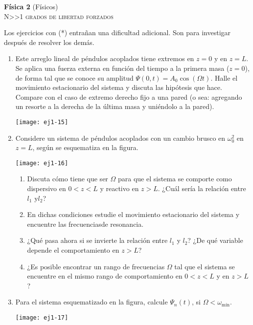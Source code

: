 \documentclass[11pt,spanish,a4paper]{article}
\begin{document}
\begin{center}
	\textbf{Física 2} (Físicos) \hfill {}\\
	\textsc{\LARGE N\textgreater\textgreater1 grados de libertad forzados}
\end{center}

Los ejercicios con (*) entrañan una dificultad adicional. Son para investigar después de resolver los demás.


\begin{enumerate}

				
\item
\begin{minipage}[t][3.5cm]{0.6\textwidth}
Este arreglo lineal de péndulos acoplados tiene extremos en $z= 0$ y en $z= L$.
Se aplica una fuerza externa en función del tiempo a la primera masa ($z=0$), de forma tal que se conoce su amplitud $\Psi(0,t)= A_0 \cos(\Omega t)$.
Halle el movimiento estacionario del sistema y discuta las hipótesis que hace.
Compare con el caso de extremo derecho fijo a una pared (o sea: agregando un resorte a la derecha de la última masa y uniéndolo a la pared). 
\end{minipage}
\begin{minipage}[c][0cm][t]{0.35\textwidth}
  \texttt{[image: ej1-15]}
\end{minipage}



\item
\begin{minipage}[t][3cm]{0.35\textwidth}
Considere un sistema de péndulos acoplados con un cambio brusco en $\omega_{0}^{2}$ en $z=L$, según se esquematiza en la figura.
\end{minipage}
\begin{minipage}[c][3cm][t]{0.6\textwidth}
  \texttt{[image: ej1-16]}
\end{minipage}
\begin{enumerate}
	\item Discuta cómo tiene que ser \(\Omega\) para que el sistema se comporte como dispersivo en \(0< z < L\) y reactivo en \(z > L\).
	¿Cuál sería la relación entre \(l_1\) y\(l_2\)?
	\item En dichas condiciones estudie el movimiento estacionario del sistema y encuentre las frecuenciasde resonancia.
	\item ¿Qué pasa ahora si se invierte la relación entre \(l_1\) y \(l_2\)?
	¿De qué variable depende el comportamiento en \(z > L\)?
	\item ¿Es posible encontrar un rango de frecuencias \(\Omega\) tal que el sistema se encuentre en el mismo rango de comportamiento en \(0< z < L\) y en \(z > L\)?
\end{enumerate}



\item
\begin{minipage}[t][3.5cm]{0.45\textwidth}
Para el sistema esquematizado en la figura, calcule $\Psi_{n}(t)$, si $\Omega<\omega_\textrm{mín}$.
\end{minipage}
\begin{minipage}[c][2cm][t]{0.5\textwidth}
  \texttt{[image: ej1-17]}
\end{minipage}




\end{enumerate}
\end{document}
